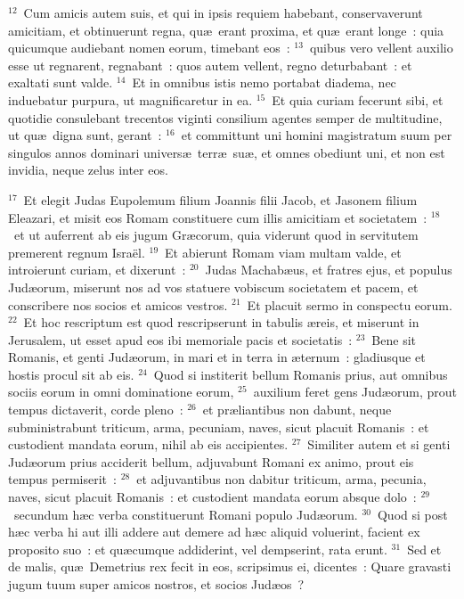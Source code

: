 ${}^{12}$~Cum amicis autem suis, et qui in ipsis requiem habebant, conservaverunt amicitiam, et obtinuerunt regna, qu\ae\ erant proxima, et qu\ae\ erant longe~: quia quicumque audiebant nomen eorum, timebant eos~:
${}^{13}$~quibus vero vellent auxilio esse ut regnarent, regnabant~: quos autem vellent, regno deturbabant~: et exaltati sunt valde.
${}^{14}$~Et in omnibus istis nemo portabat diadema, nec induebatur purpura, ut magnificaretur in ea.
${}^{15}$~Et quia curiam fecerunt sibi, et quotidie consulebant trecentos viginti consilium agentes semper de multitudine, ut qu\ae\ digna sunt, gerant~:
${}^{16}$~et committunt uni homini magistratum suum per singulos annos dominari univers\ae\ terr\ae\ su\ae , et omnes obediunt uni, et non est invidia, neque zelus inter eos.


${}^{17}$~Et elegit Judas Eupolemum filium Joannis filii Jacob, et Jasonem filium Eleazari, et misit eos Romam constituere cum illis amicitiam et societatem~:
${}^{18}$~et ut auferrent ab eis jugum Gr\ae corum, quia viderunt quod in servitutem premerent regnum Isra\"el.
${}^{19}$~Et abierunt Romam viam multam valde, et introierunt curiam, et dixerunt~:
${}^{20}$~Judas Machab\ae us, et fratres ejus, et populus Jud\ae orum, miserunt nos ad vos statuere vobiscum societatem et pacem, et conscribere nos socios et amicos vestros.
${}^{21}$~Et placuit sermo in conspectu eorum.
${}^{22}$~Et hoc rescriptum est quod rescripserunt in tabulis \ae reis, et miserunt in Jerusalem, ut esset apud eos ibi memoriale pacis et societatis~:
${}^{23}$~Bene sit Romanis, et genti Jud\ae orum, in mari et in terra in \ae ternum~: gladiusque et hostis procul sit ab eis.
${}^{24}$~Quod si institerit bellum Romanis prius, aut omnibus sociis eorum in omni dominatione eorum,
${}^{25}$~auxilium feret gens Jud\ae orum, prout tempus dictaverit, corde pleno~:
${}^{26}$~et pr\ae liantibus non dabunt, neque subministrabunt triticum, arma, pecuniam, naves, sicut placuit Romanis~: et custodient mandata eorum, nihil ab eis accipientes.
${}^{27}$~Similiter autem et si genti Jud\ae orum prius acciderit bellum, adjuvabunt Romani ex animo, prout eis tempus permiserit~:
${}^{28}$~et adjuvantibus non dabitur triticum, arma, pecunia, naves, sicut placuit Romanis~: et custodient mandata eorum absque dolo~:
${}^{29}$~secundum h\ae c verba constituerunt Romani populo Jud\ae orum.
${}^{30}$~Quod si post h\ae c verba hi aut illi addere aut demere ad h\ae c aliquid voluerint, facient ex proposito suo~: et qu\ae cumque addiderint, vel dempserint, rata erunt.
${}^{31}$~Sed et de malis, qu\ae\ Demetrius rex fecit in eos, scripsimus ei, dicentes~: Quare gravasti jugum tuum super amicos nostros, et socios Jud\ae os~?
